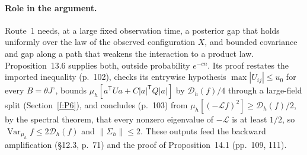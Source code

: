 \documentclass[11pt]{article}
\newcommand{\D}{\mathcal{D}}
\newcommand{\Lgen}{\mathcal{L}}
\DeclareMathOperator{\Var}{Var}
\newcommand{\norm}[1]{\lVert #1\rVert}
\newcommand{\ploc}[2]{#1}
\begin{document}
\paragraph{Role in the argument.}
Route~1 needs, at a large fixed observation time, a posterior gap that holds
uniformly over the law of the observed configuration $X$, and bounded
covariance and gap along a path that weakens the interaction to a product law.
\ploc{Proposition~13.6}{profile-positive.tex:1556--1582} supplies both,
outside probability $e^{-cn}$. Its proof restates the imported inequality
\ploc{(p.~102)}{profile-positive.tex:1585--1598}, checks its entrywise
hypothesis $\max|U_{ij}|\le u_0$ for every $B=\theta J^\circ$, bounds
$\mu_h[a^{\mathsf T}Ua+C|a|^{\mathsf T}Q|a|]$ by $\D_h(f)/4$ through a
large-field split (Section~\ref{f:P6}), and concludes
\ploc{(p.~103)}{profile-positive.tex:1683--1697} from
$\mu_h[(-\Lgen f)^2]\ge\D_h(f)/2$, by the spectral theorem, that every nonzero
eigenvalue of $-\Lgen$ is at least $1/2$, so $\Var_{\mu_h}f\le2\D_h(f)$ and
$\norm{\Sigma_h}\le2$. These
outputs feed the backward amplification
\ploc{(\S12.3, p.~71)}{profile-amplification.tex:428--435} and the proof of
Proposition~14.1 \ploc{(pp.~109, 111)}{profile-entropy.tex:427--429, 575--579}.
\end{document}
